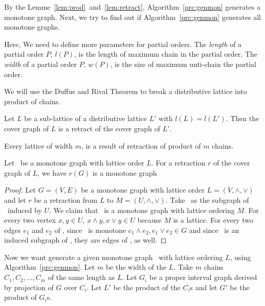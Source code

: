 By the Lemme~\ref{lem:prod}~and~\ref{lem:retract}, Algorithm~\ref{prc:genmon} generates a monotone graph.
Next, we try to find out if Algorithm~\ref{prc:genmon} generates all monotone graphs.

Here, We need to define more parameters for partial orders.
The \emph{length} of a partial order \(P\), \(l(P)\), is the length of maximum chain in
the partial order. The \emph{width} of a partial order \(P\),
\(w(P)\), is the size of maximum unti-chain the partial order.

We will use the Duffus and Rival Theorem to break a distributive lattice into 
product of chains.

\begin{theorem}  \label{thm:DR}
Let \(L\) be a sub-lattice of a distributive lattice \(L'\) with
\(l(L)=l(L')\)\@. Then the cover graph of \(L\) is a retract of the cover graph of 
\(L'\)\@.
\end{theorem}

\begin{cor}
Every lattice of width \(m\), is a result of retraction of product of
\(m\) chains.
\end{cor}

\begin{lemma} \label{lem:retract}
Let \mG\ be a monotone graph with lattice order \(L\)\@.
For a retraction \(r\) of the cover graph of \(L\), we have \(r(G)\) is a monotone graph
\end{lemma}

\begin{proof}
Let \(G=(V,E)\) be a monotone graph with lattice order \(L=(V, \wedge,\vee)\) and
let \(r\) be a retraction from \(L\) to \(M =(U, \wedge, \vee)\)\@.
Take \mH\ as the subgraph of \mG\ induced by \(U\)\@.
We claim that \mH\ is a monotone graph with lattice ordering \(M\)\@.
For every two vertex \(x,y\in U\), 
\(x\wedge y,x\vee y\in U\) because \(M\) is a lattice. For every two edges \(e_1\) and \(e_2\) of
\mH, since \mG\ is monotone \(e_1\wedge e_2,e_1\vee e_2\in G\)
and since \mH\ is an induced subgraph of \mG, they are edges of 
\mH, as well.
\end{proof}

Now we want generate a given monotone graph \mG\ with lattice ordering \(L\),
using Algorithm~\ref{prc:genmon}. Let \(m\) be the width of the \(L\)\@.
Take \(m\) chains \(C_1,C_2,\dotsc,C_m\) of the same length as \(L\)\@.
Let \(G_i\) be a proper interval graph derived by projection of \(G\) over \(C_i\)\@. 
Let \(L'\) be the product of the \(C_i\)s and let \(G'\) be the product of \(G_i\)s.

